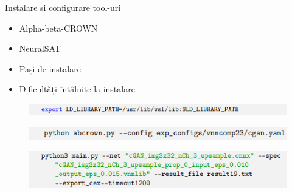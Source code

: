 \begin{frame}{Instalare si configurare tool-uri}
    \begin{itemize}
        \item Alpha-beta-CROWN
        \item NeuralSAT
        \item Pași de instalare
        \item Dificultăți întâlnite la instalare
    \end{itemize}
    
    \begin{figure}[ht]
    \centering
    {\includegraphics[width=10 cm]{images/caracterizare/libcuda.png}}
    \label{obstacole}
    \end{figure}

    \begin{figure}[ht]
    \centering
    {\includegraphics[width=10 cm]{images/caracterizare/rulareabc.png}}
    \label{obstacole}
    \end{figure}

    \begin{figure}[ht]
    \centering
    {\includegraphics[width=10 cm]{images/caracterizare/rulareneu.png}}
    \label{obstacole}
    \end{figure}
\end{frame}
